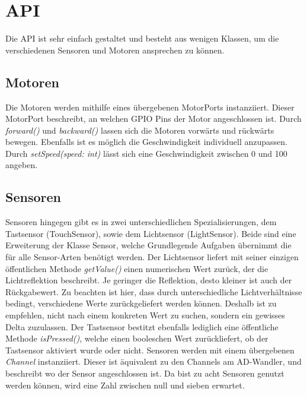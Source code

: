 \section{API}

Die API ist sehr einfach gestaltet und besteht aus wenigen Klassen, um die verschiedenen Sensoren und Motoren ansprechen zu können. 


\clearpage %

\subsection{Motoren}
Die Motoren werden mithilfe eines übergebenen MotorPorts instanziiert. Dieser MotorPort beschreibt, an welchen GPIO Pins der Motor angeschlossen ist. Durch \emph{forward()} und \emph{backward()} lassen sich die Motoren vorwärts und rückwärts bewegen. Ebenfalls ist es möglich die Geschwindigkeit individuell anzupassen. Durch \emph{setSpeed(speed: int)} lässt sich eine Geschwindigkeit zwischen 0 und 100 angeben. 

\subsection{Sensoren}
Sensoren hingegen gibt es in zwei unterschiedlichen Spezialisierungen, dem Tastsensor (TouchSensor), sowie dem Lichtsensor (LightSensor). Beide sind eine Erweiterung der Klasse Sensor, welche Grundlegende Aufgaben übernimmt die für alle Sensor-Arten benötigt werden. Der Lichtsensor liefert mit seiner einzigen öffentlichen Methode \emph{getValue()} einen numerischen Wert zurück, der die Lichtreflektion beschreibt. Je geringer die Reflektion, desto kleiner ist auch der Rückgabewert. Zu beachten ist hier, dass durch unterschiedliche Lichtverhältnisse bedingt, verschiedene Werte zurückgeliefert werden können. Deshalb ist zu empfehlen, nicht nach einem konkreten Wert zu suchen, sondern ein gewisses Delta zuzulassen. Der Tastsensor bestitzt ebenfalls lediglich eine öffentliche Methode \emph{isPressed()}, welche einen booleschen Wert zurückliefert, ob der Tastsensor aktiviert wurde oder nicht. Sensoren werden mit einem übergebenen \emph{Channel} instanziiert. Dieser ist äquivalent zu den Channels am AD-Wandler, und beschreibt wo der Sensor angeschlossen ist. Da bist zu acht Sensoren genutzt werden können, wird eine Zahl zwischen null und sieben erwartet.

